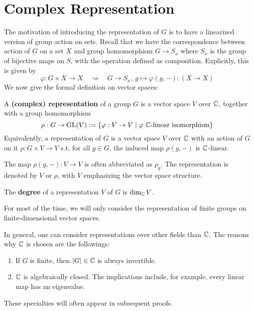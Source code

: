 \section{Complex Representation}

\textstart
The motivation of introducing the representation of $G$ is to have a linearized version of group action on sets. Recall that we have the correspondence between action of $G$ on a set $X$ and group homomorphism $G \to S_x$ where $S_x$ is the group of bijective maps on $S$, with the operation defined as composition. Explicitly, this is given by
\[
    \varphi: G \times X \to X \quad \rightsquigarrow \quad G \to S_x,\ g \mapsto \varphi(g, -) : (X \to X) 
\]
We now give the formal definition on vector spaces:

\begin{definition}[Representation]
    A \textbf{(complex) representation} of a group $G$ is a vector space $V$ over $\mathbb{C}$, together with a group homomorphism 
    \[
        \rho: G \to \mathrm{GL}(V) := \{ \varphi: V \to V \mid \varphi \text{ $\mathbb{C}$-linear isomorphism} \}
    \]
    Equivalently, a representation of $G$ is a vector space $V$ over $\mathbb{C}$ with an action of $G$ on it $\rho: G \times V \to V$ s.t. for all $g \in G$, the induced map $\rho(g, -)$ is $\mathbb{C}$-linear.
\end{definition}

\begin{notation}
    The map $\rho(g, -): V \to V$ is often abbreviated as $\rho_g$. The representation is denoted by $V$ or $\rho$, with $V$ emphasizing the vector space structure.
\end{notation}

\begin{definition}
    The \textbf{degree} of a representation $V$ of $G$ is $\dim_{\mathbb{C}}V$. 
\end{definition}

\textstart
For most of the time, we will only consider the representation of finite groups on finite-dimensional vector spaces.

\begin{remark}
    In general, one can consider representations over other fields than $\mathbb{C}$. The reasons why $\mathbb{C}$ is chosen are the followings:
    \begin{enumerate}[label=\arabic*)]
        \item If $G$ is finite, then $\left|G\right| \in \mathbb{C}$ is always invertible.
        \item $\mathbb{C}$ is algebraically closed. The implications include, for example, every linear map has an eigenvalue.
    \end{enumerate}
    These specialties will often appear in subsequent proofs. 
\end{remark}

